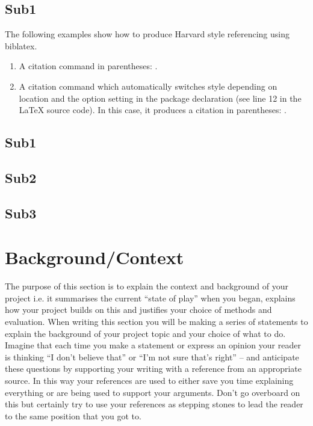 \documentclass[a4paper, 12pt]{article}
\begin{document}
\subsection{Sub1}


The following examples show how to produce Harvard style referencing using biblatex.

\begin{enumerate}
	\item A citation command in parentheses: \parencite{Smith:2012qr}.
	\item A citation command which automatically switches style depending on location and the option setting in the package declaration (see line 12 in the LaTeX source code). In this case, it produces a citation in parentheses: \autocite{Other:2014ab}.
\end{enumerate}


\subsection{Sub1}


\subsection{Sub2}


\subsection{Sub3}



\pagebreak


\section{Background/Context} %
The purpose of this section is to explain the context and background of your project i.e. it summarises the current “state of play” when you began, explains how your project builds on this and justifies your choice of methods and evaluation. When writing this section you will be making a series of statements to explain the background of your project topic and your choice of what to do. Imagine that each time you make a statement or express an opinion your reader is thinking “I don’t believe that” or “I’m not sure that’s right” – and anticipate these questions by supporting your writing with a reference from an appropriate source. In this way your references are used to either save you time explaining everything or are being used to support your arguments. Don’t go overboard on this but certainly try to use your references as stepping stones to lead the reader to the same position that you got to.
\end{document}
